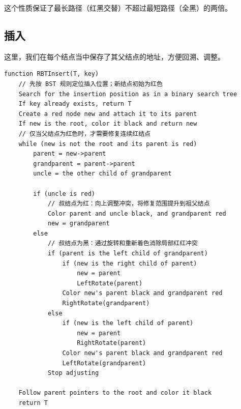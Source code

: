 \documentclass[openany]{book}
\begin{document}
这个性质保证了最长路径（红黑交替）不超过最短路径（全黑）的两倍。

\subsection{插入}
这里，我们在每个结点当中保存了其父结点的地址，方便回溯、调整。
\begin{lstlisting}
function RBTInsert(T, key)
    // 先按 BST 规则定位插入位置；新结点初始为红色
    Search for the insertion position as in a binary search tree
    If key already exists, return T
    Create a red node new and attach it to its parent
    If new is the root, color it black and return new
    // 仅当父结点为红色时，才需要修复连续红结点
    while (new is not the root and its parent is red)
        parent = new->parent
        grandparent = parent->parent
        uncle = the other child of grandparent

        if (uncle is red)
            // 叔结点为红：向上调整冲突，将修复范围提升到祖父结点
            Color parent and uncle black, and grandparent red
            new = grandparent
        else
            // 叔结点为黑：通过旋转和重新着色消除局部红红冲突
            if (parent is the left child of grandparent)
                if (new is the right child of parent)
                    new = parent
                    LeftRotate(parent)
                Color new's parent black and grandparent red
                RightRotate(grandparent)
            else
                if (new is the left child of parent)
                    new = parent
                    RightRotate(parent)
                Color new's parent black and grandparent red
                LeftRotate(grandparent)
            Stop adjusting

    Follow parent pointers to the root and color it black
    return T
\end{lstlisting}
\end{document}
